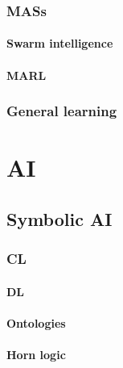 \documentclass[12pt,a4paper,openright,twoside]{book}
\begin{document}
\subsection{\Aclp{MAS}}\label{subsec:mas}

\subsubsection{Swarm intelligence}\label{subsubsec:swarm-intelligence}

\subsubsection{\Acl{MARL}}\label{subsubsec:marl}

\subsection{General learning}\label{subsec:general-learning}


\chapter{\Acl{AI}}\label{ch:ai}

\section{Symbolic \ac{AI}}\label{sec:symbolic-ai}

\subsection{\Acl{CL}}\label{subsec:cl}

\subsubsection{\Acl{DL}}\label{subsubsec:dl}

\subsubsection{Ontologies}\label{subsubsec:ontologies}

\subsubsection{Horn logic}\label{subsubsec:horn-logic}
\end{document}
